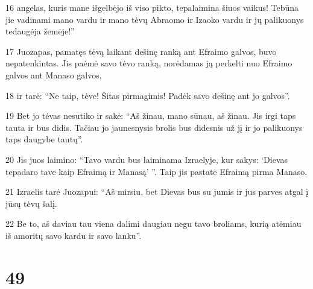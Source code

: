 \par 16 angelas, kuris mane išgelbėjo iš viso pikto, tepalaimina šiuos vaikus! Tebūna jie vadinami mano vardu ir mano tėvų Abraomo ir Izaoko vardu ir jų palikuonys tedaugėja žemėje!” 
\par 17 Juozapas, pamatęs tėvą laikant dešinę ranką ant Efraimo galvos, buvo nepatenkintas. Jis paėmė savo tėvo ranką, norėdamas ją perkelti nuo Efraimo galvos ant Manaso galvos, 
\par 18 ir tarė: “Ne taip, tėve! Šitas pirmagimis! Padėk savo dešinę ant jo galvos”. 
\par 19 Bet jo tėvas nesutiko ir sakė: “Aš žinau, mano sūnau, aš žinau. Jis irgi taps tauta ir bus didis. Tačiau jo jaunesnysis brolis bus didesnis už jį ir jo palikuonys taps daugybe tautų”. 
\par 20 Jis juos laimino: “Tavo vardu bus laiminama Izraelyje, kur sakys: ‘Dievas tepadaro tave kaip Efraimą ir Manasą’ ”. Taip jis pastatė Efraimą pirma Manaso. 
\par 21 Izraelis tarė Juozapui: “Aš mirsiu, bet Dievas bus su jumis ir jus parves atgal į jūsų tėvų šalį. 
\par 22 Be to, aš daviau tau viena dalimi daugiau negu tavo broliams, kurią atėmiau iš amoritų savo kardu ir savo lanku”.



\chapter{49}


